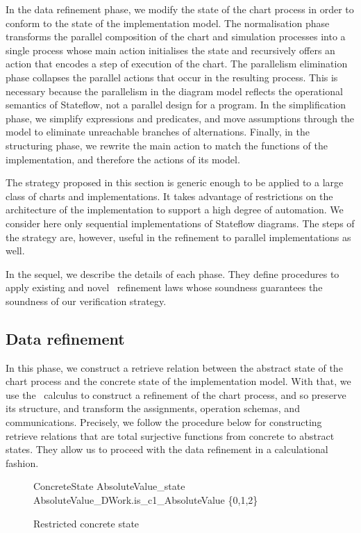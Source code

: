 \documentclass[submission]{eptcs}
\begin{document}
In the data refinement phase, we modify the state of the chart process in order to conform to the state of the implementation model. The normalisation phase transforms the parallel composition of the chart and simulation processes into a single process whose main action initialises the state and recursively offers an action that encodes a step of execution of the chart. The parallelism elimination phase collapses the parallel actions that occur in the resulting process. This is necessary because the parallelism in the diagram model reflects the operational semantics of Stateflow, not a parallel design for a program. In the simplification phase, we simplify expressions and predicates, and move assumptions through the model to eliminate unreachable branches of alternations. Finally, in the structuring phase, we rewrite the main action to match the functions of the implementation, and therefore the actions of its model.

The strategy proposed in this section is generic enough to be applied to a large class of charts and implementations. It takes advantage of restrictions on the architecture of the implementation to support a high degree of automation. We consider here only sequential implementations of Stateflow diagrams. The steps of the strategy are, however, useful in the refinement to parallel implementations as well.

In the sequel, we describe the details of each phase. They define procedures to apply existing and novel \Circus\ refinement laws whose soundness guarantees the soundness of our verification strategy.

\subsection{Data refinement}
\label{subsec:data}

In this phase, we construct a retrieve relation between the abstract state of the chart process and the concrete state of the implementation model. With that, we use the \Circus~calculus to construct a refinement of the chart process, and so preserve its structure, and transform the assignments, operation schemas, and communications. Precisely, we follow the procedure below for constructing retrieve relations that are total surjective functions from concrete to abstract states. They allow us to proceed with the data refinement in a calculational fashion.

\begin{figure}
\begin{schema}{ConcreteState}
AbsoluteValue\_state
\where
AbsoluteValue\_DWork.is\_c1\_AbsoluteValue \in \{0,1,2\}
\end{schema}
\caption{Restricted concrete state}
\label{fig:concrete}
\end{figure}
\end{document}
